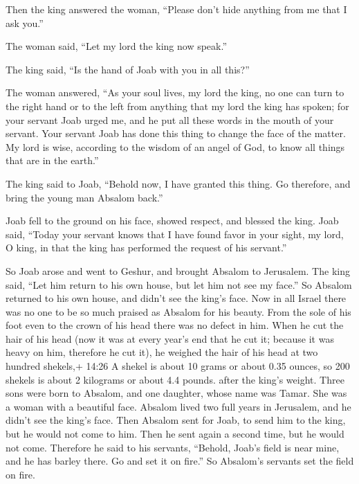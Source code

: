  Then the king answered the woman, ``Please don't hide
anything from me that I ask you.''

The woman said, ``Let my lord the king now speak.''

 The king said, ``Is the hand of Joab with you in all
this?''

The woman answered, ``As your soul lives, my lord the king, no one can
turn to the right hand or to the left from anything that my lord the
king has spoken; for your servant Joab urged me, and he put all these
words in the mouth of your servant.  Your servant Joab has
done this thing to change the face of the matter. My lord is wise,
according to the wisdom of an angel of God, to know all things that are
in the earth.''

 The king said to Joab, ``Behold now, I have granted this
thing. Go therefore, and bring the young man Absalom back.''

 Joab fell to the ground on his face, showed respect, and
blessed the king. Joab said, ``Today your servant knows that I have
found favor in your sight, my lord, O king, in that the king has
performed the request of his servant.''

 So Joab arose and went to Geshur, and brought Absalom to
Jerusalem.  The king said, ``Let him return to his own
house, but let him not see my face.'' So Absalom returned to his own
house, and didn't see the king's face.  Now in all Israel
there was no one to be so much praised as Absalom for his beauty. From
the sole of his foot even to the crown of his head there was no defect
in him.  When he cut the hair of his head (now it was at
every year's end that he cut it; because it was heavy on him, therefore
he cut it), he weighed the hair of his head at two hundred shekels,+
14:26 A shekel is about 10 grams or about 0.35 ounces, so 200 shekels is
about 2 kilograms or about 4.4 pounds. after the king's weight.
 Three sons were born to Absalom, and one daughter, whose
name was Tamar. She was a woman with a beautiful face. 
Absalom lived two full years in Jerusalem, and he didn't see the king's
face.  Then Absalom sent for Joab, to send him to the king,
but he would not come to him. Then he sent again a second time, but he
would not come.  Therefore he said to his servants,
``Behold, Joab's field is near mine, and he has barley there. Go and set
it on fire.'' So Absalom's servants set the field on fire.

